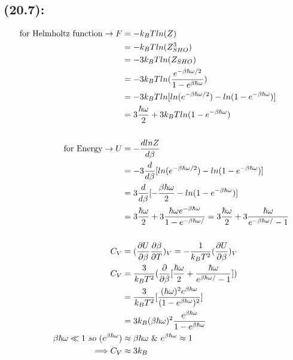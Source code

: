 \begin{latin}
    \section*{(20.7):}
    \begin{alignat*}{2}
        \text{for Helmholtz function} \to F &= -k_BTln(Z)\\
        &=-k_BTln(Z_{SHO}^3)\\
        &= -3k_BTln(Z_{SHO})\\
        &= -3k_BTln(\frac{e^{-\beta \hbar \omega/2}}{1 -e^{\beta \hbar \omega}})\\
        &= -3k_B Tln [ln(e^{-\beta \hbar \omega/2}) - ln(1-e^{-\beta \hbar \omega})]\\
        &= 3\frac{\hbar \omega}{2} + 3k_BT ln (1-e^{-\beta \hbar \omega})\\\\
        \textmd{for Energy} \to U&= -\frac{dlnZ}{d\beta}\\
        &= -3\frac{d}{d\beta}[ln(e^{-\beta \hbar \omega/2}) - ln(1-e^{-\beta \hbar \omega})]\\
        &= 3\frac{d}{d\beta}[-\frac{\beta \hbar \omega}{2}- ln(1-e^{-\beta \hbar \omega})]\\
        &= 3\frac{\hbar \omega}{2} + 3\frac{\hbar \omega e^{-\beta \hbar \omega}}{1-e^{-\beta \hbar \omega/}}= 3\frac{\hbar \omega}{2} + 3\frac{\hbar \omega }{e^{-\beta \hbar \omega/}-1}\\\\
        C_V &= (\frac{\partial U}{\partial \beta}\frac{\partial \beta}{\partial T})_V = -\frac{1}{k_B T^2}(\frac{\partial U}{\partial \beta})_V\\
        C_V &= \frac{3}{k_B T^2}(\frac{\partial }{\partial \beta}[\frac{\hbar \omega}{2} + \frac{\hbar \omega }{e^{\beta \hbar \omega/}-1}])\\
        &= \frac{3}{k_B T^2}[\frac{(\hbar \omega)^2e^{\beta \hbar \omega}}{(1-e^{\beta \hbar \omega})^2}]\\
        &=3k_B (\beta \hbar \omega)^2\frac{e^{\beta \hbar \omega}}{1-e^{\beta \hbar \omega}}\\
        \beta \hbar \omega \ll 1 \ so \ (e^{\beta \hbar \omega}) &\approx \beta \hbar \omega  \ \& \  e^{\beta \hbar \omega} \approx 1\\
        \Longrightarrow C_V &\approx 3k_B
    \end{alignat*}

\end{latin}

